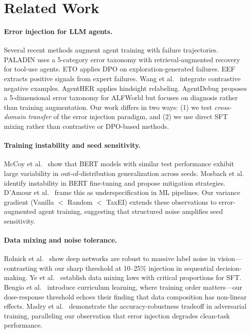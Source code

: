 \section{Related Work}
\label{sec:related_work}

\paragraph{Error injection for LLM agents.}
Several recent methods augment agent training with failure trajectories. PALADIN \cite{paladin2025} uses a 5-category error taxonomy with retrieval-augmented recovery for tool-use agents. ETO \cite{song2024eto} applies DPO on exploration-generated failures. EEF \cite{eef2025} extracts positive signals from expert failures. Wang et al.\  integrate contrastive negative examples. AgentHER \cite{agentHER2025} applies hindsight relabeling. AgentDebug \cite{agentdebug2025} proposes a 5-dimensional error taxonomy for ALFWorld but focuses on diagnosis rather than training augmentation. Our work differs in two ways: (1) we test \emph{cross-domain transfer} of the error injection paradigm, and (2) we use direct SFT mixing rather than contrastive or DPO-based methods.

\paragraph{Training instability and seed sensitivity.}
McCoy et al.\  show that BERT models with similar test performance exhibit large variability in out-of-distribution generalization across seeds. Mosbach et al.\  identify instability in BERT fine-tuning and propose mitigation strategies. D'Amour et al.\  frame this as underspecification in ML pipelines. Our variance gradient (Vanilla $<$ Random $<$ TaxEI) extends these observations to error-augmented agent training, suggesting that structured noise amplifies seed sensitivity.

\paragraph{Data mixing and noise tolerance.}
Rolnick et al.\  show deep networks are robust to massive label noise in vision---contrasting with our sharp threshold at 10--25\% injection in sequential decision-making. Ye et al.\  establish data mixing laws with critical proportions for SFT. Bengio et al.\  introduce curriculum learning, where training order matters---our dose-response threshold echoes their finding that data composition has non-linear effects. Madry et al.\  demonstrate the accuracy-robustness tradeoff in adversarial training, paralleling our observation that error injection degrades clean-task performance.

